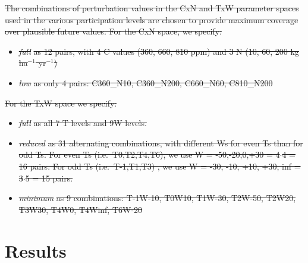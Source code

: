 \documentclass[gmd, manuscript]{copernicus} %
\providecommand{\DIFdel}[1]{{\protect\color{red}\sout{#1}}}                      %
\providecommand{\DIFdelend}{} %
\begin{document}
\DIFdel{The combinations of perturbation values in the CxN and TxW parameter spaces used in the various participation levels are chosen to provide maximum coverage over plausible future values. For the CxN space, we specify:
}%
\begin{itemize}%
\item%
\textit{\DIFdel{full}} %
\DIFdel{as 12 pairs, with 4 C values (360, 660, 810 ppm) and 3 N (10, 60, 200 kg ha$^{-1}$ yr$^{-1}$)
  }%
\item%
\textit{\DIFdel{low}} %
\DIFdel{as only 4 pairs: C360\_N10, C360\_N200, C660\_N60, C810\_N200
}
\end{itemize}%

\DIFdel{For the TxW space we specify:
}%
\begin{itemize}%
\item%
\textit{\DIFdel{full}} %
\DIFdel{as all 7 T levels and 9W levels.
  }%
\item%
\textit{\DIFdel{reduced}} %
\DIFdel{as 31 alternating combinations, with different Ws for even Ts than for odd Ts. For even Ts (i.e.\ T0,T2,T4,T6), we use W = -50,-20,0,+30 = 4$\cdot$4 = 16 pairs. For odd Ts (i.e.\ T-1,T1,T3) , we use W = -30, -10, +10, +30, inf = 3$\cdot$5 = 15 pairs.
  }%
\item%
\textit{\DIFdel{minimum}} %
\DIFdel{as 9 combinations: T-1W-10, T0W10, T1W-30, T2W-50, T2W20, T3W30, T4W0, T4Winf, T6W-20
}
\end{itemize}%

\DIFdelend %
\section{Results}
\label{S:4}
\end{document}
